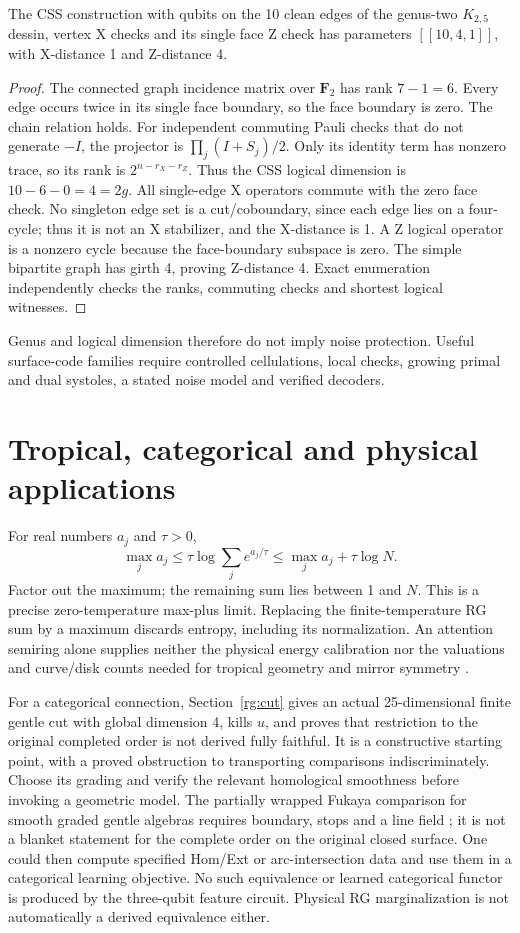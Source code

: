 \begin{proposition}
The CSS construction with qubits on the 10 clean edges of the genus-two
$ K_{2,5}$ dessin, vertex X checks and its single face Z check has parameters
$[[10,4,1]]$, with X-distance 1 and Z-distance 4.
\end{proposition}
\begin{proof}
The connected graph incidence matrix over $\mathbf F_2$ has rank $7-1=6$.
Every edge occurs twice in its single face boundary, so the face boundary
is zero. The chain relation holds. For independent commuting Pauli checks that do
not generate $-I $, the projector is $\prod_j(I+S_j)/2$. Only its identity
term has nonzero trace, so its rank is $2^{n-r_X-r_Z}$. Thus the CSS logical
dimension is $10-6-0=4=2 g $.
All single-edge X operators commute with the zero face check. No singleton
edge set is a cut/coboundary, since each edge lies on a four-cycle; thus it is not
an X stabilizer, and the X-distance is 1. A Z logical operator is a nonzero
cycle because the face-boundary subspace is zero. The simple bipartite graph
has girth 4, proving Z-distance 4. Exact enumeration independently checks the
ranks, commuting checks and shortest logical witnesses.
\end{proof}
Genus and logical dimension therefore do not imply noise protection.
Useful surface-code families require controlled cellulations, local checks,
growing primal and dual systoles, a stated noise model and verified decoders.

\section{Tropical, categorical and physical applications}
For real numbers $ a_j $ and $\tau>0$,
\[
 \max_j a_j\le\tau\log\sum_j e^{a_j/\tau}
       \le\max_j a_j+\tau\log N.
\]
Factor out the maximum; the remaining sum lies between 1 and $ N $. This is a
precise zero-temperature max-plus limit. Replacing the finite-temperature
RG sum by a maximum discards entropy, including its normalization. An
attention semiring alone supplies neither the physical energy calibration
nor the valuations and curve/disk counts needed for tropical geometry and
mirror symmetry \cite{QGrossSiebert}.

For a categorical connection, Section~\ref{rg:cut} gives an actual
25-dimensional finite gentle cut with global dimension 4, kills $ u $, and
proves that restriction to the original completed order is not derived fully
faithful. It is a constructive starting point, with a proved obstruction to
transporting comparisons indiscriminately. Choose its grading and verify the
relevant homological smoothness before invoking a geometric model.
The partially wrapped Fukaya comparison for smooth graded gentle algebras
requires boundary, stops and a line field \cite{LekiliPolishchuk}; it is not
a blanket statement for the complete order on the original closed surface.
One could then compute specified Hom/Ext or arc-intersection data and use
them in a categorical learning objective. No such equivalence or learned
categorical functor is produced by the three-qubit feature circuit. Physical
RG marginalization is not automatically a derived equivalence either.

